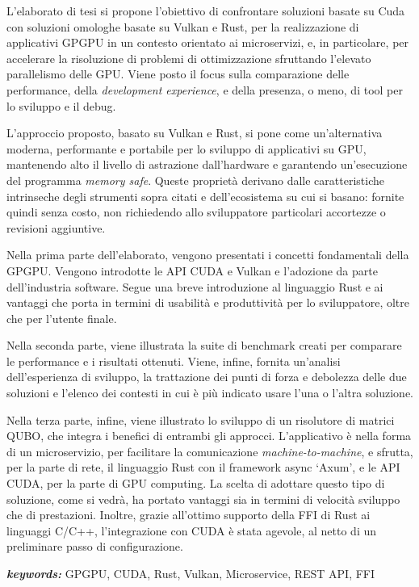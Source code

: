 
L'elaborato di tesi si propone l'obiettivo di confrontare soluzioni basate su Cuda con soluzioni omologhe basate su Vulkan e Rust, per la realizzazione di applicativi GPGPU in un contesto orientato ai microservizi, e, in particolare, per accelerare la risoluzione di problemi di ottimizzazione sfruttando l'elevato parallelismo delle GPU. Viene posto il focus sulla comparazione delle performance, della \textit{development experience}, e della presenza, o meno, di tool per lo sviluppo e il debug.

L'approccio proposto, basato su Vulkan e Rust, si pone come un'alternativa moderna, performante e portabile per lo sviluppo di applicativi su GPU, mantenendo alto il livello di astrazione dall'hardware e garantendo un'esecuzione del programma \textit{memory safe}. Queste proprietà derivano dalle caratteristiche intrinseche degli strumenti sopra citati e dell'ecosistema su cui si basano: fornite quindi senza costo, non richiedendo allo sviluppatore particolari accortezze o revisioni aggiuntive.

Nella prima parte dell'elaborato, vengono presentati i concetti fondamentali della GPGPU. Vengono introdotte le API CUDA e Vulkan e l'adozione da parte dell'industria software. Segue una breve introduzione al linguaggio Rust e ai vantaggi che porta in termini di usabilità e produttività per lo sviluppatore, oltre che per l'utente finale.

Nella seconda parte, viene illustrata la suite di benchmark creati per comparare le performance e i risultati ottenuti. Viene, infine, fornita un'analisi dell'esperienza di sviluppo, la trattazione dei punti di forza e debolezza delle due soluzioni e l'elenco dei contesti in cui è più indicato usare l'una o l'altra soluzione.

Nella terza parte, infine, viene illustrato lo sviluppo di un risolutore di matrici QUBO, che integra i benefici di entrambi gli approcci. L'applicativo è nella forma di un microservizio, per facilitare la comunicazione \textit{machine-to-machine}, e sfrutta, per la parte di rete, il linguaggio Rust con il framework async `Axum', e le API CUDA, per la parte di GPU computing. La scelta di adottare questo tipo di soluzione, come si vedrà, ha portato vantaggi sia in termini di velocità sviluppo che di prestazioni. Inoltre, grazie all'ottimo supporto della FFI di Rust ai linguaggi C/C++, l'integrazione con CUDA è stata agevole, al netto di un preliminare passo di configurazione.

\bigskip

\textit{\textbf{keywords:}} GPGPU, CUDA, Rust, Vulkan, Microservice, REST API, FFI